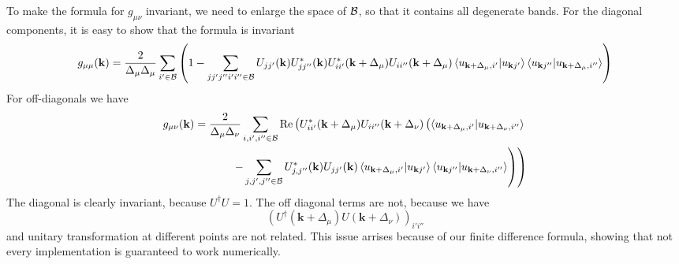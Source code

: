 \documentclass[onecolumn, prb,preprintnumbers,amsmath,amssymb,floatfix]{revtex4}
\newcommand{\vk}{{\mathbf{k}}}
\newcommand{\cb}{{\cal B}}
\begin{document}
To make the formula for $g_{\mu\nu}$ invariant, we need to enlarge the space of $\cb$, so that it contains all degenerate bands.
For the diagonal components, it is easy to show that the formula is invariant
\begin{eqnarray}
g_{\mu\mu}(\vk)  =
  \frac{2}{\Delta_\mu\Delta_\mu}\sum_{i' \in \cb}
  \left(1  -\sum_{jj'j''i'i''\in\cb}
  U_{jj'}(\vk)U^*_{jj''}(\vk) U_{i i'}^*(\vk+\Delta_{\mu})U_{i i''}(\vk+\Delta_\mu)
  \braket{ u_{\vk+\Delta_\mu,i'}|u_{\vk j'}}\braket{u_{\vk j''}| u_{\vk+\Delta_\mu,i''}}\right)
\end{eqnarray}
%
For off-diagonals we have
\begin{eqnarray}
g_{\mu\nu}(\vk)  =
  \frac{2}{\Delta_\mu\Delta_\nu}\sum_{i,i',i''\in \cb}\textrm{Re}
  \left(U^*_{i i'}(\vk+\Delta_\mu)U_{i i''}(\vk+\Delta_\nu)
  \left(\braket{u_{\vk+\Delta_\mu,i'}|u_{\vk+\Delta_\nu,i''}}
  \right.\right.
\\  
  \left.\left.
  -\sum_{j,j',j''\in\cb}
  U^*_{j,j''}(\vk)U_{jj'}(\vk)\braket{ u_{\vk+\Delta_\mu,i'}|u_{\vk j'}}\braket{u_{\vk j''}| u_{\vk+\Delta_\nu,i''}}
  \right)\right)
\end{eqnarray}
The diagonal is clearly invariant, because $U^\dagger U=1$. The off
diagonal terms are not, because we have
$$(U^\dagger(\vk+\Delta_\mu)U(\vk+\Delta_\nu))_{i'i''}$$ and unitary
transformation at different points are not related. This issue arrises
because of our finite difference formula, showing that not every
implementation is guaranteed to work numerically.
\end{document}
